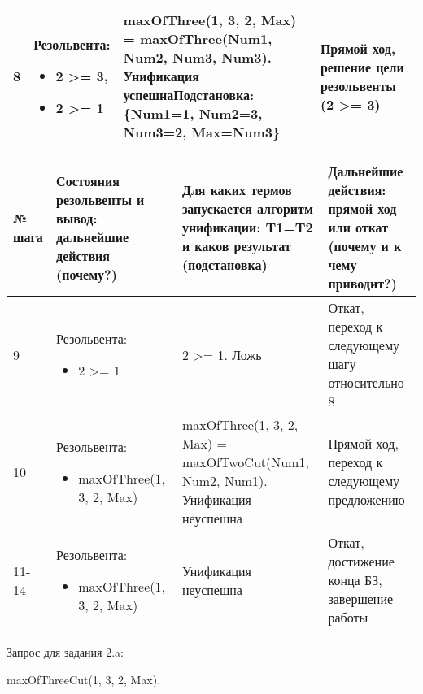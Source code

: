 \documentclass[14pt,a4paper]{scrreprt}
\begin{document}
\begin{table}[H]
\begin{tabular}{|p{0.8cm\small}|p{4.7cm\small}|p{5.7cm\small}|p{4cm\small}|}
		\hline
		8 & Резольвента:\begin{itemize} \item 2 >= 3, \item 2 >= 1 \end{itemize} & maxOfThree(1, 3, 2, Max) = maxOfThree(Num1, Num2, Num3, Num3). Унификация успешна\linebreak \textbf{Подстановка:} \{Num1=1, Num2=3, Num3=2, Max=Num3\} & Прямой ход, решение цели резольвенты (2 >= 3) \\
		\hline
	\end{tabular}
\end{table}

\begin{table}[H]
	\begin{tabular}{|p{0.8cm\small}|p{4.7cm\small}|p{5.7cm\small}|p{4cm\small}|}	
		\hline
		№ шага & Состояния резольвенты и вывод: дальнейшие действия (почему?) & Для каких термов запускается алгоритм унификации: T1=T2 и каков результат (подстановка) & Дальнейшие действия: прямой ход или откат (почему и к чему приводит?)\\
		\hline
		9 & Резольвента:\begin{itemize}\item 2 >= 1 \end{itemize} & 2 >= 1. Ложь & Откат, переход к следующему шагу относительно 8\\
		\hline
		10 & Резольвента:\begin{itemize}\item maxOfThree(1, 3, 2, Max) \end{itemize}& maxOfThree(1, 3, 2, Max) = maxOfTwoCut(Num1, Num2, Num1). Унификация неуспешна & Прямой ход, переход к следующему предложению\\
		\hline
		11-14 & Резольвента:\begin{itemize}\item maxOfThree(1, 3, 2, Max) \end{itemize} & Унификация неуспешна & Откат, достижение конца БЗ, завершение работы\\
		\hline
	\end{tabular}
\end{table}

Запрос для задания 2.a:

maxOfThreeCut(1, 3, 2, Max).
\end{document}
